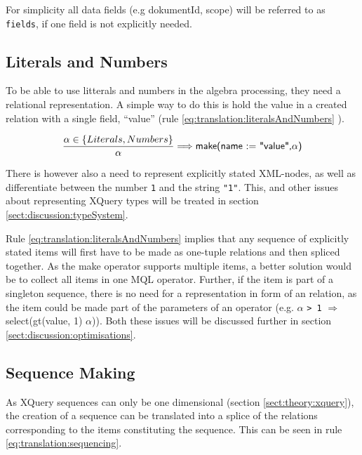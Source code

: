For simplicity all data fields (e.g \textsf{dokumentId, scope}) will be
referred to as \verb!fields!, if one field is not explicitly needed.

\subsection{Literals and Numbers}
\label{sect:translation:mXr:litAndNumbers}
To be able to use litterals and numbers in the algebra processing, they need a
relational representation. A simple way to do this is hold the value in a
created relation with a single field, ``value'' (rule
\ref{eq:translation:literalsAndNumbers} ).

\begin{equation}
\centering
\frac{\alpha \in \left\{ Literals, Numbers \right\} }{\alpha}
\Longrightarrow
\textsf{make(name := "value",} \alpha \textsf{)}
\label{eq:translation:literalsAndNumbers}
\end{equation}

There is however also a need to represent explicitly stated XML-nodes, as well
as differentiate between the number \texttt{1} and the string \texttt{"1"}.
This, and other issues about representing XQuery types will be treated in
section \ref{sect:discussion:typeSystem}.

Rule \ref{eq:translation:literalsAndNumbers} implies that any sequence of
explicitly stated items will first have to be made as one-tuple relations and
then spliced together. As the \textsf{make} operator supports multiple items, a
better solution would be to collect all items in one MQL operator. Further, if
the item is part of a singleton sequence, there is no need for a representation
in form of an relation, as the item could be made part of the parameters of an
operator (e.g. $\alpha$ \texttt{> 1} $\Longrightarrow$
\textsf{select(gt(value, 1) $\alpha$)}). Both these issues will be discussed
further in section \ref{sect:discussion:optimisations}.



\subsection{Sequence Making}
\label{sect:translation:mXr:sequencing}
As XQuery sequences can only be one dimensional (section
\ref{sect:theory:xquery}), the creation of a sequence can be translated into a
splice of the relations corresponding to the items constituting the sequence.
This can be seen in rule \ref{eq:translation:sequencing}. 

